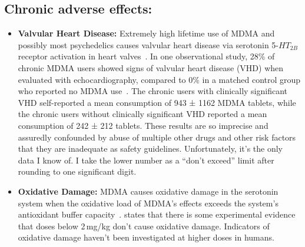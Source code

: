 \documentclass[11pt,oneside]{book}
\let\cite\parencite
\begin{document}
\subsection*{Chronic adverse effects:}
\begin{itemize}
    \item \textbf{Valvular Heart Disease:} Extremely high lifetime use of MDMA and possibly most psychedelics causes valvular heart disease via serotonin 5-$HT_{2B}$ receptor activation in heart valves~\cite{droogmans2007valvular,tagen2023valvular}. In one observational study, 28\% of chronic MDMA users showed signs of valvular heart disease (VHD) when evaluated with echocardiography, compared to 0\% in a matched control group who reported no MDMA use~\cite{droogmans2007valvular}. The chronic users with clinically significant VHD self-reported a mean consumption of 943 ± 1162 MDMA tablets, while the chronic users without clinically significant VHD reported a mean consumption of 242 ± 212 tablets. These results are so imprecise and assuredly confounded by abuse of multiple other drugs and other risk factors that they are inadequate as safety guidelines. Unfortunately, it's the only data I know of. I take the lower number as a \enquote{don't exceed} limit after rounding to one significant digit.
    \item \textbf{Oxidative Damage:} MDMA causes oxidative damage in the serotonin system when the oxidative load of MDMA's effects exceeds the system's antioxidant buffer capacity~\cite{baggottDamage}. \textcite{baggottSupplements} states that there is some experimental evidence that doses below 2\,mg/kg don't cause oxidative damage. Indicators of oxidative damage haven't been investigated at higher doses in humans.
    

\end{itemize}
\end{document}
